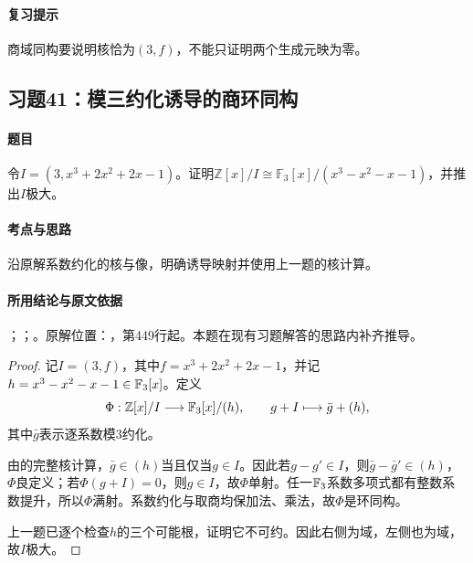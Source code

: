 \paragraph{复习提示}

商域同构要说明核恰为$(3,f)$，不能只证明两个生成元映为零。



\subsection{习题41：模三约化诱导的商环同构}

\label{ex:3:41}

\paragraph{题目}

令$I=(3,x^3+2x^2+2x-1)$。证明$\mathbb Z[x]/I\cong\mathbb F_3[x]/(x^3-x^2-x-1)$，并推出$I$极大。

\paragraph{考点与思路}

沿原解系数约化的核与像，明确诱导映射并使用上一题的核计算。

\paragraph{所用结论与原文依据}

；；。原解位置：，第449行起。本题在现有习题解答的思路内补齐推导。


\begin{proof}

记$I=(3,f)$，其中$f=x^3+2x^2+2x-1$，并记$h=x^3-x^2-x-1\in\mathbb F_3[x]$。定义
\[
\Phi:\mathbb Z[x]/I\longrightarrow\mathbb F_3[x]/(h),\qquad
g+I\longmapsto\bar g+(h),
\]
其中$\bar g$表示逐系数模$3$约化。

由的完整核计算，$\bar g\in(h)$当且仅当$g\in I$。因此若$g-g'\in I$，则$\bar g-\bar g'\in(h)$，$\Phi$良定义；若$\Phi(g+I)=0$，则$g\in I$，故$\Phi$单射。任一$\mathbb F_3$系数多项式都有整数系数提升，所以$\Phi$满射。系数约化与取商均保加法、乘法，故$\Phi$是环同构。

上一题已逐个检查$h$的三个可能根，证明它不可约。因此右侧为域，左侧也为域，故$I$极大。

\end{proof}

